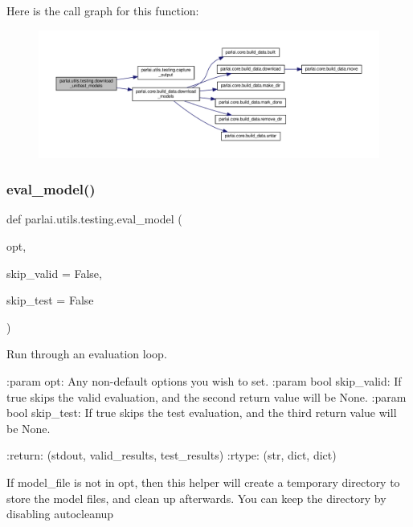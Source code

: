 Here is the call graph for this function\+:
\nopagebreak
\begin{figure}[H]
\begin{center}
\leavevmode
\includegraphics[width=350pt]{namespaceparlai_1_1utils_1_1testing_ae0c93fc8f4c3e079333dba0065fa4dd2_cgraph}
\end{center}
\end{figure}
\mbox{\label{namespaceparlai_1_1utils_1_1testing_a6fb595d4398ee27f4d183911419a222a}} 
\subsubsection{\texorpdfstring{eval\+\_\+model()}{eval\_model()}}
{\footnotesize\ttfamily def parlai.\+utils.\+testing.\+eval\+\_\+model (\begin{DoxyParamCaption}\item[{}]{opt,  }\item[{}]{skip\+\_\+valid = {\ttfamily False},  }\item[{}]{skip\+\_\+test = {\ttfamily False} }\end{DoxyParamCaption})}

\begin{DoxyVerb}Run through an evaluation loop.

:param opt:
    Any non-default options you wish to set.
:param bool skip_valid:
    If true skips the valid evaluation, and the second return value will be None.
:param bool skip_test:
    If true skips the test evaluation, and the third return value will be None.

:return: (stdout, valid_results, test_results)
:rtype: (str, dict, dict)

If model_file is not in opt, then this helper will create a temporary directory
to store the model files, and clean up afterwards. You can keep the directory
by disabling autocleanup
\end{DoxyVerb}
 


